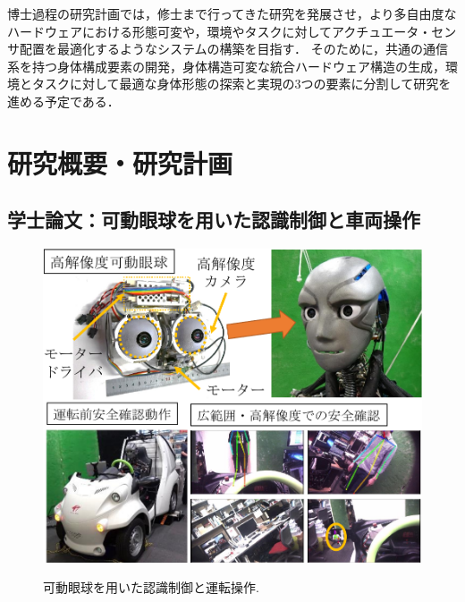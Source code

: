 \documentclass[twocolumn]{d-abst}
\begin{document}
博士過程の研究計画では，修士まで行ってきた研究を発展させ，より多自由度なハードウェアにおける形態可変や，環境やタスクに対してアクチュエータ・センサ配置を最適化するようなシステムの構築を目指す．
そのために，共通の通信系を持つ身体構成要素の開発，身体構造可変な統合ハードウェア構造の生成，環境とタスクに対して最適な身体形態の探索と実現の3つの要素に分割して研究を進める予定である．


\section{研究概要・研究計画}

\subsection{学士論文：可動眼球を用いた認識制御と車両操作}

\begin{figure}[tbh]
 \begin{center}
  \begin{minipage}{0.8\columnwidth}
   \includegraphics[width=\columnwidth]{1_eye.pdf}
   \caption{可動眼球を用いた認識制御と運転操作.}
  \end{minipage}
  \label{figure:nowprinting}
 \end{center}
\end{figure}
\end{document}
